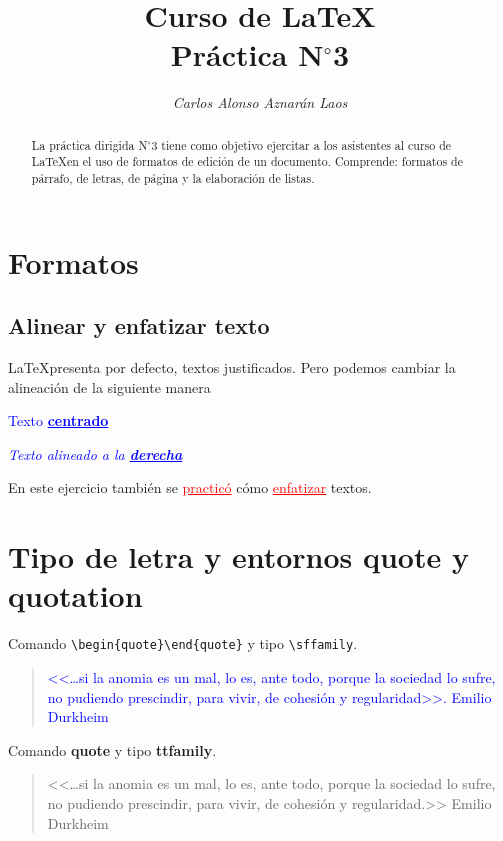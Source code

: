 \documentclass[12pt,a4paper]{article}
\author{\textit{Carlos Alonso Aznarán Laos}}
\title{
	Curso de \LaTeX\\
	{\normalsize\textbf{{Práctica N$^{\circ}$3}}}
} %
\begin{document}
\maketitle
\begin{abstract}
	La práctica dirigida N$^{\circ}$3 tiene como objetivo ejercitar a
	los asistentes al curso de \LaTeX en el uso de formatos de edición
	de un documento.
	Comprende: formatos de párrafo, de letras, de página y la
	elaboración de listas.
\end{abstract}

\section{Formatos}

\subsection{Alinear y enfatizar texto}
\LaTeX{}presenta por defecto, textos justificados.
Pero podemos cambiar la alineación de la siguiente manera
\begin{center}
	\textcolor{Blue}{Texto \textbf{\underline{centrado}}}
\end{center}
\begin{flushright}
	\textcolor{Blue}{
		\textit{Texto alineado a la \underline{\textbf{derecha}}}}
\end{flushright}
En este ejercicio también se \textcolor{Red}{\underline{practicó}}
cómo \textcolor{Red}{\underline{enfatizar}} textos.

\section{Tipo de letra y entornos quote y quotation}

Comando \verb|\begin{quote}\end{quote}| y tipo \verb|\sffamily|.
\begin{quote}
	\sffamily
	\textcolor{Blue}{
		<<\ldots si la anomia es un mal, lo es, ante todo, porque la
		sociedad lo sufre, no pudiendo prescindir, para vivir, de
		cohesión y regularidad>>.
		Emilio Durkheim
	}
\end{quote}
Comando \textbf{quote} y tipo \textbf{ttfamily}.
\begin{quote}
	\ttfamily
	<<\ldots si la anomia es un mal, lo es, ante todo, porque la
	sociedad lo sufre, no pudiendo prescindir, para vivir, de cohesión
	y regularidad.>>
	Emilio Durkheim
\end{quote}
\end{document}
